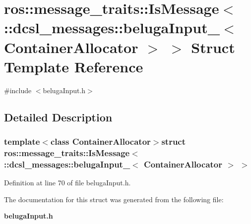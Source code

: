\section{ros\-:\-:message\-\_\-traits\-:\-:\-Is\-Message$<$ \-:\-:dcsl\-\_\-messages\-:\-:beluga\-Input\-\_\-$<$ \-Container\-Allocator $>$ $>$ \-Struct \-Template \-Reference}
\label{structros_1_1message__traits_1_1IsMessage_3_01_1_1dcsl__messages_1_1belugaInput___3_01ContainerAllocator_01_4_01_4}


{\ttfamily \#include $<$beluga\-Input.\-h$>$}



\subsection{\-Detailed \-Description}
\subsubsection*{template$<$class Container\-Allocator$>$struct ros\-::message\-\_\-traits\-::\-Is\-Message$<$ \-::dcsl\-\_\-messages\-::beluga\-Input\-\_\-$<$ Container\-Allocator $>$ $>$}



\-Definition at line 70 of file beluga\-Input.\-h.



\-The documentation for this struct was generated from the following file\-:\begin{DoxyCompactItemize}
\item 
{\bf beluga\-Input.\-h}\end{DoxyCompactItemize}
